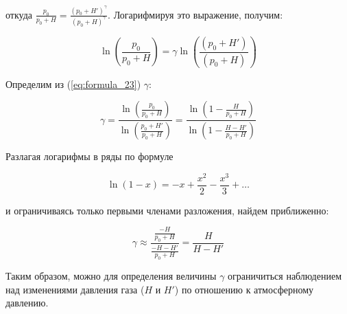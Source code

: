 откуда $\frac{p_0}{p_0 + H} = \frac{\left (p_0 + H' \right )^ \gamma}{\left (p_0 + H \right )^ \gamma}$. Логарифмируя это выражение, получим:

\begin{equation}
    \ln \left (\frac{p_0}{p_0 + H} \right ) = \gamma \ln \left (\frac{\left (p_0 + H' \right )}{\left (p_0 + H \right )} \right )
    \label{eq:formula_23}
\end{equation}

Определим из (\ref{eq:formula_23}) $\gamma$:

\begin{equation}
    \gamma = \frac{\ln \left (\frac{p_0}{p_0 + H} \right )}{\ln \left (\frac{p_0 + H'}{p_0 + H} \right )} = \frac{\ln \left (1 - \frac{H}{p_0 + H} \right )}{\ln \left (1 - \frac{H - H'}{p_0 + H} \right )}
    \label{eq:formula_24}
\end{equation}

Разлагая логарифмы в ряды по формуле

\begin{equation}
    \ln \left (1 - x \right ) = -x + \frac{x^2}{2} - \frac{x^3}{3} + \dots
    \label{eq:formula_25}
\end{equation}

и ограничиваясь только первыми членами разложения, найдем приближенно: 

\begin{equation}
    \gamma \approx \frac{\frac{-H}{p_0 + H}}{\frac{-H - H'}{p_0 + H}} = \frac{H}{H - H'}
    \label{eq:formula_26}
\end{equation}


Таким образом, можно для определения величины $\gamma$ ограничиться наблюдением над изменениями давления газа ($H$ и $H'$) по отношению к атмосферному давлению.

